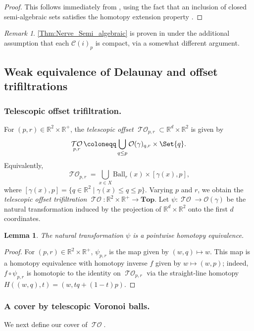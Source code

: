 \documentclass[11pt]{amsart}
\newcommand{\R}{\mathbb{R}} %
\newcommand{\Ball}{\text{Ball}}
\DeclareMathOperator{\TelOffset}{\mathcal{TO}}
\newcommand{\Top}{\textbf{Top}}
\newcommand{\deff}{\emph}
\newcommand{\Offset}[0]{\mathcal{O}}
\renewcommand{\subparagraph}[1]{\subsubsection*{\textbf{\textup{#1}}}}
\theoremstyle{plain}
\newtheorem{lemma}[theorem]{Lemma}
\newtheorem{proposition}[theorem]{Proposition}
\theoremstyle{definition}
\theoremstyle{remark}
\newtheorem{remark}[theorem]{Remark}
\begin{document}
%
\begin{proof}
This follows immediately from \cite[Theorem 5.9]{bauerUnifiedViewFunctorial2023}, using the fact that an inclusion of closed semi-algebraic sets satisfies the homotopy extension property \cite[Theorem 4]{delfs1984separation}.
\end{proof}
%
\begin{remark} \cref{Thm:Nerve_Semi_algebraic} is proven in \cite[Theorem 4.10]{bauerUnifiedViewFunctorial2023} under the additional assumption that each $\mathcal{C}(i)_p$ is compact, via a somewhat different argument.
\end{remark}
%
\subsection{Weak equivalence of Delaunay and offset trifiltrations}
%
\subparagraph{Telescopic offset trifiltration.} For $(p,r)\in\R^{2}\times \R^+$, the \deff{telescopic offset} $\TelOffset_{p,r} \subset \R^{d}\times \R^2$ is given by
\begin{equation}
  \TelOffset_{p,r} \coloneqq \bigcup_{q\leq p} \Offset(\gamma)_{q,r} \times \Set{q}.
\end{equation}
Equivalently, \[\TelOffset_{p,r}= \bigcup_{x\in X} \Ball_r(x)\times [\gamma(x),p],\] where $ [\gamma(x),p]=\{q\in \R^2\mid \gamma(x)\leq q\leq p\}$.  Varying $p$ and $r$, we obtain the \deff{telescopic offset trifiltration}
$\TelOffset\colon \R^{2}\times\R^{+} \to \Top$.  %
Let $\psi\colon \TelOffset\to \Offset(\gamma)$ be the natural transformation induced by the projection of $\R^d\times \R^2$ onto the first $d$ coordinates. 
\begin{lemma}\label{prop:teloffset}
The natural transformation $\psi$ is a pointwise homotopy equivalence.
\end{lemma}
\begin{proof}
For $(p,r)\in \R^2\times \R^+$, $\psi_{p,r}$ is the map given by $(w,q)\mapsto w$.  This map is a homotopy equivalence with homotopy inverse $f$ given by $w\mapsto (w,p)$; indeed, $f \circ \psi_{p,r}$ is homotopic to the identity on $\TelOffset_{p,r}$ via the straight-line homotopy $H((w,q),t)=(w,tq+(1-t)p)$.
\end{proof}
%
%
\subparagraph{A cover by telescopic Voronoi balls.}
We next define our cover of $\TelOffset$.  %
\end{document}
